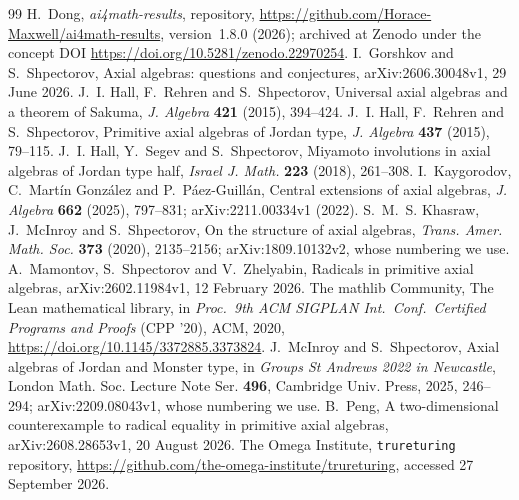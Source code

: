 \documentclass[11pt]{article}
\theoremstyle{definition}
\theoremstyle{remark}
\newcommand{\repoversion}{1.8.0}
\begin{document}
{\footnotesize
\begin{thebibliography}{99}\setlength{\itemsep}{0pt}
H.~Dong, \emph{ai4math-results}, repository,
\url{https://github.com/Horace-Maxwell/ai4math-results}, version~\repoversion{}
(2026); archived at Zenodo under the concept DOI
\url{https://doi.org/10.5281/zenodo.22970254}.
I.~Gorshkov and S.~Shpectorov, Axial algebras: questions and conjectures,
arXiv:2606.30048v1, 29 June 2026.
J.~I. Hall, F.~Rehren and S.~Shpectorov, Universal axial algebras and a
theorem of Sakuma, \emph{J. Algebra} \textbf{421} (2015), 394--424.
J.~I. Hall, F.~Rehren and S.~Shpectorov, Primitive axial algebras of Jordan
type, \emph{J. Algebra} \textbf{437} (2015), 79--115.
J.~I. Hall, Y.~Segev and S.~Shpectorov, Miyamoto involutions in axial
algebras of Jordan type half, \emph{Israel J. Math.} \textbf{223} (2018),
261--308.
I.~Kaygorodov, C.~Mart\'in Gonz\'alez and P.~P\'aez-Guill\'an, Central
extensions of axial algebras, \emph{J. Algebra} \textbf{662} (2025),
797--831; arXiv:2211.00334v1 (2022).
S.~M.~S. Khasraw, J.~McInroy and S.~Shpectorov, On the structure of axial
algebras, \emph{Trans. Amer. Math. Soc.} \textbf{373} (2020), 2135--2156;
arXiv:1809.10132v2, whose numbering we use.
A.~Mamontov, S.~Shpectorov and V.~Zhelyabin, Radicals in primitive axial
algebras, arXiv:2602.11984v1, 12 February 2026.
The mathlib Community, The Lean mathematical library, in \emph{Proc.\ 9th ACM
SIGPLAN Int.\ Conf.\ Certified Programs and Proofs} (CPP '20), ACM, 2020,
\url{https://doi.org/10.1145/3372885.3373824}.
J.~McInroy and S.~Shpectorov, Axial algebras of Jordan and Monster type, in
\emph{Groups St Andrews 2022 in Newcastle}, London Math. Soc. Lecture Note
Ser. \textbf{496}, Cambridge Univ. Press, 2025, 246--294; arXiv:2209.08043v1,
whose numbering we use.
B.~Peng, A two-dimensional counterexample to radical equality in primitive
axial algebras, arXiv:2608.28653v1, 20 August 2026.
The Omega Institute, \texttt{trureturing} repository,
\url{https://github.com/the-omega-institute/trureturing}, accessed 27
September 2026.
\end{thebibliography}}
\end{document}
